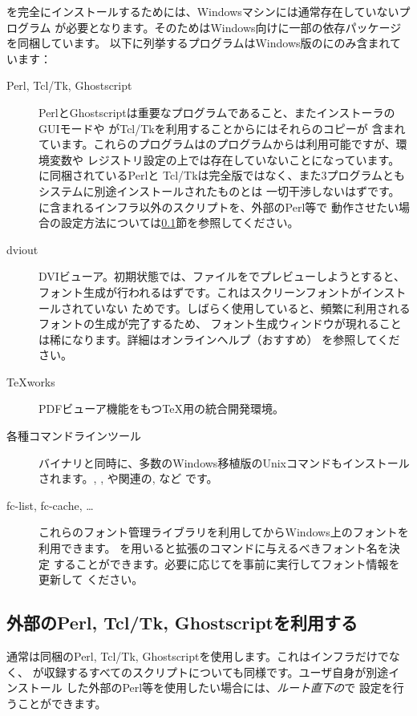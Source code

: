 \documentclass[uplatex,dvipdfmx,12pt,tombow]{jsarticle}
\begin{document}
\TL を完全にインストールするためには、Windowsマシンには通常存在していないプログラム
が必要となります。そのため\TL はWindows向けに一部の依存パッケージを同梱しています。
以下に列挙するプログラムはWindows版の\TL にのみ含まれています：
%
\begin{description}
\item[Perl, Tcl/Tk, Ghostscript]
PerlとGhostscriptは重要なプログラムであること、また\TL インストーラのGUIモードや
がTcl/Tkを利用することから\TL にはそれらのコピーが
含まれています。これらのプログラムは\TL のプログラムからは利用可能ですが、環境変数や
レジストリ設定の上では存在していないことになっています。\TL に同梱されているPerlと
Tcl/Tkは完全版ではなく、また3プログラムともシステムに別途インストールされたものとは
一切干渉しないはずです。\TL に含まれるインフラ以外のスクリプトを、外部のPerl等で
動作させたい場合の設定方法については\ref{sec:windows-external}節を参照してください。

\item[dviout]
DVIビューア。初期状態では、ファイルをでプレビューしようとすると、
フォント生成が行われるはずです。これはスクリーンフォントがインストールされていない
ためです。しばらく使用していると、頻繁に利用されるフォントの生成が完了するため、
フォント生成ウィンドウが現れることは稀になります。詳細はオンラインヘルプ（おすすめ）
を参照してください。

\item[\TeX works]
PDFビューア機能をもつ\TeX 用の統合開発環境。

\item[各種コマンドラインツール]
\TL バイナリと同時に、多数のWindows移植版のUnixコマンドもインストールされます。, , や関連の, など
です。

\item[fc-list, fc-cache, \ldots]
これらのフォント管理ライブラリを利用して\XeTeX からWindows上のフォントを利用できます。
を用いると\XeTeX 拡張のコマンドに与えるべきフォント名を決定
することができます。必要に応じてを事前に実行してフォント情報を更新して
ください。
\end{description}

\subsection{外部のPerl, Tcl/Tk, Ghostscriptを利用する}
\label{sec:windows-external}

通常\TL は同梱のPerl, Tcl/Tk, Ghostscriptを使用します。これはインフラだけでなく、
\TL が収録するすべてのスクリプトについても同様です。ユーザ自身が別途インストール
した外部のPerl等を使用したい場合には、\emph{\TL ルート直下の}で
設定を行うことができます。
\end{document}

